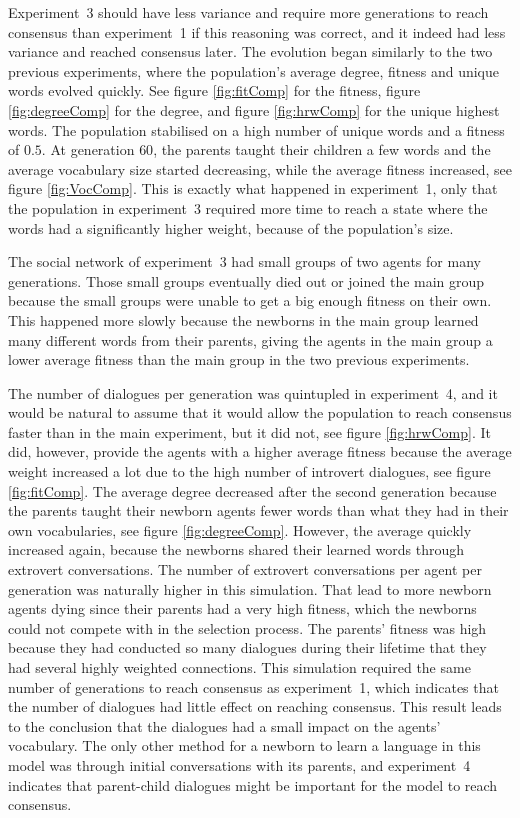 Experiment~3 should have less variance and require more generations to reach consensus than experiment~1 if this reasoning was correct, and it indeed had less variance and reached consensus later. The evolution began similarly to the two previous experiments, where the population's average degree, fitness and unique words evolved quickly. See figure \ref{fig:fitComp} for the fitness, figure \ref{fig:degreeComp} for the degree, and figure \ref{fig:hrwComp} for the unique highest words. The population stabilised on a high number of unique words and a fitness of $0.5$. At generation $60$, the parents taught their children a few words and the average vocabulary size started decreasing, while the average fitness increased, see figure \ref{fig:VocComp}. This is exactly what happened in experiment~1, only that the population in experiment~3 required more time to reach a state where the words had a significantly higher weight, because of the population’s size. 

The social network of experiment~3 had small groups of two agents for many generations. Those small groups eventually died out or joined the main group because the small groups were unable to get a big enough fitness on their own. This happened more slowly because the newborns in the main group learned many different words from their parents, giving the agents in the main group a lower average fitness than the main group in the two previous experiments.

The number of dialogues per generation was quintupled in experiment~4, and it would be natural to assume that it would allow the population to reach consensus faster than in the main experiment, but it did not, see figure \ref{fig:hrwComp}. It did, however, provide the agents with a higher average fitness because the average weight increased a lot due to the high number of introvert dialogues, see figure \ref{fig:fitComp}. The average degree decreased after the second generation because the parents taught their newborn agents fewer words than what they had in their own vocabularies, see figure \ref{fig:degreeComp}. However, the average quickly increased again, because the newborns shared their learned words through extrovert conversations. The number of extrovert conversations per agent per generation was naturally higher in this simulation. That lead to more newborn agents dying since their parents had a very high fitness, which the newborns could not compete with in the selection process. The parents' fitness was high because they had conducted so many dialogues during their lifetime that they had several highly weighted connections. This simulation required the same number of generations to reach consensus as experiment~1, which indicates that the number of dialogues had little effect on reaching consensus. This result leads to the conclusion that the dialogues had a small impact on the agents' vocabulary. The only other method for a newborn to learn a language in this model was through initial conversations with its parents, and experiment~4 indicates that parent-child dialogues might be important for the model to reach consensus.  

